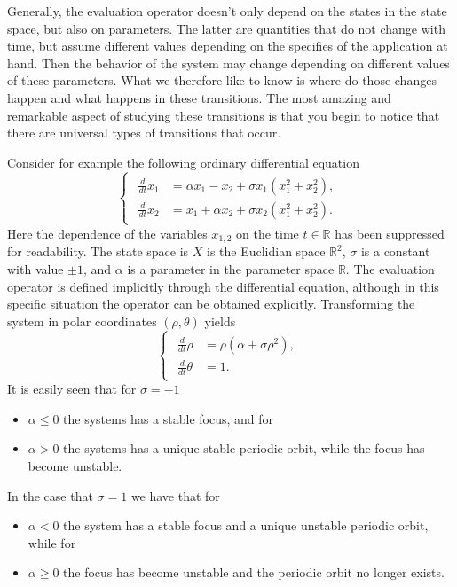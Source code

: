 Generally, the evaluation operator doesn't only depend on the states in the
state space, but also on parameters. The latter are quantities that do not
change with time, but assume different values depending on the specifies of the
application at hand. Then the behavior of the system may change depending on
different values of these parameters. What we therefore like to know is where
do those changes happen and what happens in these transitions. The most amazing
and remarkable aspect of studying these transitions is that you begin to notice
that there are universal types of transitions that occur.

Consider for example the following ordinary differential equation
\[
    \begin{cases}
    \begin{aligned}
        \frac{d}{dt} x_1 &= \alpha x_1  - x_2 + \sigma x_1(x_1^2 + x_2^2), \\
        \frac{d}{dt} x_2 &= x_1 + \alpha  x_2 + \sigma x_2(x_1^2 + x_2^2).
    \end{aligned}
    \end{cases}
\]
Here the dependence of the variables $x_{1,2}$ on the time $t\in \mathbb R$ has
been suppressed for readability. The state space is $X$ is the Euclidian space
$\mathbb R^2$, $\sigma$ is a constant with value $\pm 1$, and $\alpha$ is a
parameter in the parameter space $\mathbb R$. The evaluation operator is defined
implicitly through the differential equation, although in this specific situation
the operator can be obtained explicitly. Transforming the system in polar
coordinates $(\rho, \theta)$ yields
\[
    \begin{cases}
    \begin{aligned}
        \frac{d}{dt} \rho &= \rho(\alpha + \sigma \rho^2), \\
        \frac{d}{dt} \theta &= 1.
    \end{aligned}
    \end{cases}
\]
It is easily seen that for $\sigma=-1$
\begin{itemize}
    \item $\alpha \leq 0$ the systems has a stable focus, and for 
    \item $\alpha > 0$ the systems has a unique stable periodic orbit,
        while the focus has become unstable.
\end{itemize}
In the case that $\sigma=1$ we have that for
\begin{itemize}
    \item $\alpha < 0$ the system has a stable focus and a unique unstable
        periodic orbit, while for
    \item $\alpha \geq 0$ the focus has become
        unstable and the periodic orbit no longer exists.
\end{itemize}
